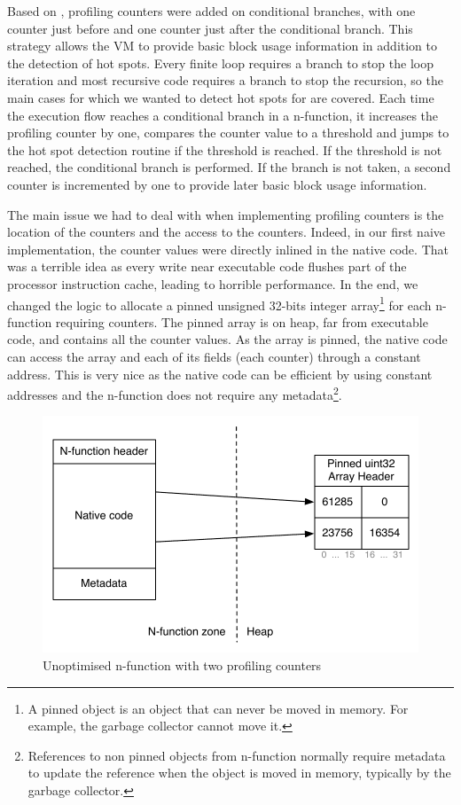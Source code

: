 \documentclass[a4paper,12pt,twoside]{../includes/ThesisStyle}
\begin{document}
Based on \cite{Arn02}, profiling counters were added on conditional branches, with one counter just before and one counter just after the conditional branch. This strategy allows the VM to provide basic block usage information in addition to the detection of hot spots. Every finite loop requires a branch to stop the loop iteration and most recursive code requires a branch to stop the recursion, so the main cases for which we wanted to detect hot spots for are covered. Each time the execution flow reaches a conditional branch in a n-function, it increases the profiling counter by one, compares the counter value to a threshold and jumps to the hot spot detection routine if the threshold is reached. If the threshold is not reached, the conditional branch is performed. If the branch is not taken, a second counter is incremented by one to provide later basic block usage information.

The main issue we had to deal with when implementing profiling counters is the location of the counters and the access to the counters. Indeed, in our first naive implementation, the counter values were directly inlined in the native code. That was a terrible idea as every write near executable code flushes part of the processor instruction cache, leading to horrible performance. In the end, we changed the logic to allocate a pinned unsigned 32-bits integer array\footnote{A pinned object is an object that can never be moved in memory. For example, the garbage collector cannot move it.} for each n-function requiring counters. The pinned array is on heap, far from executable code, and contains all the counter values. As the array is pinned, the native code can access the array and each of its fields (each counter) through a constant address. This is very nice as the native code can be efficient by using constant addresses and the n-function does not require any metadata\footnote{References to non pinned objects from n-function normally require metadata to update the reference when the object is moved in memory, typically by the garbage collector.}.

\begin{figure}[h!]
    \begin{center}
        \includegraphics[width=0.8\linewidth]{ProfilingCounters}
        \caption{Unoptimised n-function with two profiling counters}
        \label{fig:ProfilingCounters}
    \end{center}
\end{figure}
\end{document}
